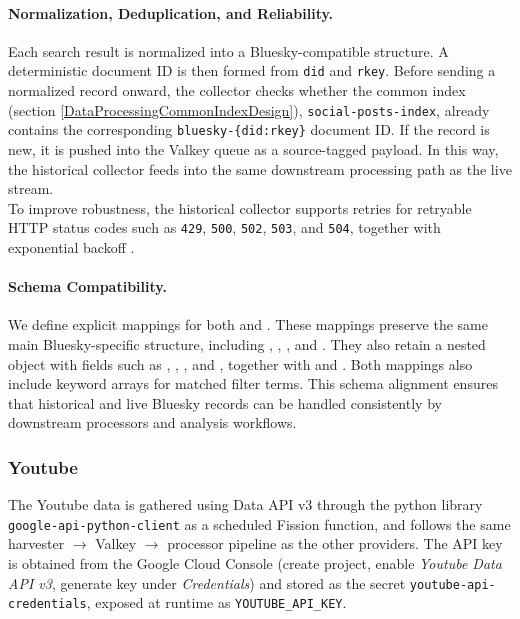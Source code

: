 \paragraph{Normalization, Deduplication, and Reliability.}
Each search result is normalized into a Bluesky-compatible structure. A deterministic document ID is then formed from \texttt{did} and \texttt{rkey}. Before sending a normalized record onward, the collector checks whether the common index (section \ref{DataProcessingCommonIndexDesign}), \texttt{social-posts-index}, already contains the corresponding \texttt{bluesky-\{did:rkey\}} document ID. If the record is new, it is pushed into the Valkey queue as a source-tagged payload. In this way, the historical collector feeds into the same downstream processing path as the live stream.
\\

To improve robustness, the historical collector supports retries for retryable HTTP status codes such as \texttt{429}, \texttt{500}, \texttt{502}, \texttt{503}, and \texttt{504}, together with exponential backoff \cite{bluesky2026ratelimits}.

\paragraph{Schema Compatibility.}
We define explicit mappings for both  and . These mappings preserve the same main Bluesky-specific structure, including , , , and . They also retain a nested  object with fields such as , , , and , together with  and . Both mappings also include keyword arrays for matched filter terms. This schema alignment ensures that historical and live Bluesky records can be handled consistently by downstream processors and analysis workflows.

\subsubsection{Youtube}

The Youtube data is gathered using Data API v3 \cite{youtube2026dataapi} through the python library \texttt{google-api-python-client} as a scheduled Fission function, and follows the same harvester $\rightarrow$ Valkey $\rightarrow$ processor pipeline as the other providers. The API key is obtained from the Google Cloud Console (create project, enable \textit{Youtube Data API v3}, generate key under \textit{Credentials}) and stored as the secret \texttt{youtube-api-credentials}, exposed at runtime as \texttt{YOUTUBE\_API\_KEY}.

